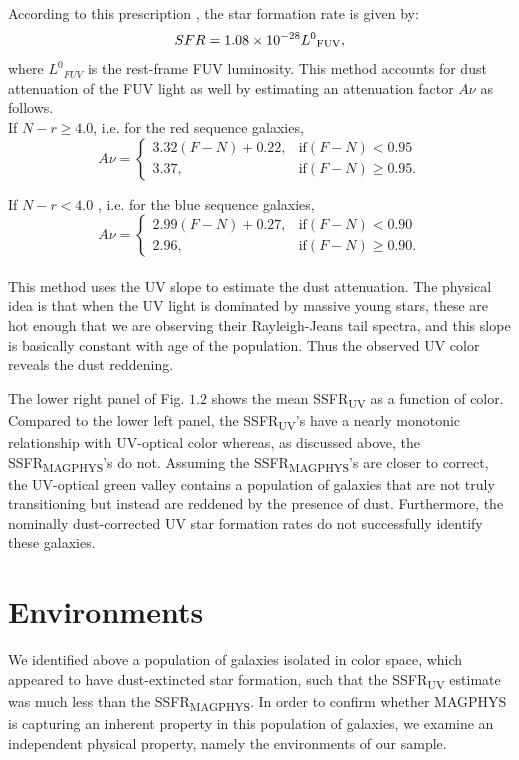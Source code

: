 According to this prescription \citep{salim_uv_2007-1}, 
the star formation rate is given by:
$$ SFR = 1.08 \times 10^{-28}{L^{0}}_{\rm FUV}, $$
where ${L^{0}}_{FUV}$ is the rest-frame FUV luminosity. 
This method accounts for dust attenuation of the 
FUV light as well by estimating an attenuation 
factor $A\nu$ as follows.\\

If $N-r \geq 4.0$, i.e. for the red sequence galaxies,\\

$$ A\nu = \begin{cases} 3.32 (F-N) + 0.22, & \text{if} (F-N) < 0.95\\3.37, & \text{if} (F-N) \geq 0.95. \end{cases}$$

If $N-r < 4.0$ , i.e. for the blue sequence galaxies,\\

$$A\nu = \begin{cases} 2.99(F-N) + 0.27, & \text{if}(F-N) < 0.90\\2.96, & \text{if} (F-N) \geq 0.90. \end{cases}$$\\

This method uses the UV slope to estimate the dust attenuation. The 
physical idea is that when the UV light is dominated by massive young
stars, these are hot enough that we are observing their Rayleigh-Jeans
tail spectra, and this slope is basically constant with age of the
population. Thus the observed UV color reveals the dust reddening.

The lower right panel of Fig. $1.2$ shows the mean 
SSFR\textsubscript{UV} as a function of color. Compared to the 
lower left panel, the SSFR\textsubscript{UV}'s have a nearly 
monotonic relationship with UV-optical color whereas, as discussed 
above, the SSFR\textsubscript{MAGPHYS}'s do not. Assuming 
the SSFR\textsubscript{MAGPHYS}'s are closer to correct, the 
UV-optical green valley contains a population of galaxies that 
are not truly transitioning but instead are reddened by the 
presence of dust. Furthermore, the nominally dust-corrected 
UV star formation rates do not successfully identify these 
galaxies. 



\section{Environments}

We identified above a population of galaxies isolated in 
color space, which appeared to have dust-extincted star formation, 
such that the SSFR\textsubscript{UV} estimate was much less 
than the SSFR\textsubscript{MAGPHYS}. In order to confirm whether 
MAGPHYS is capturing an inherent property in this population of 
galaxies, we examine an independent physical property, namely 
the environments of our sample.\\

